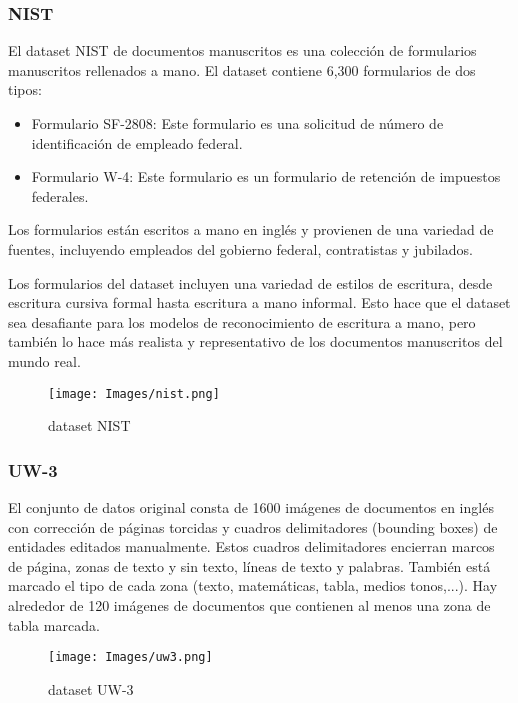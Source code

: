 \documentclass{article}
\begin{document}
\subsubsection{NIST}

El dataset NIST \cite{11} de documentos manuscritos es una colección de formularios manuscritos rellenados a mano. El dataset contiene 6,300 formularios de dos tipos:
\begin{itemize}
    \item Formulario SF-2808: Este formulario es una solicitud de número de identificación de empleado federal.
    \item Formulario W-4: Este formulario es un formulario de retención de impuestos federales.
\end{itemize}

Los formularios están escritos a mano en inglés y provienen de una variedad de fuentes, incluyendo empleados del gobierno federal, contratistas y jubilados.

 Los formularios del dataset incluyen una variedad de estilos de escritura, desde escritura cursiva formal hasta escritura a mano informal. Esto hace que el dataset sea desafiante para los modelos de reconocimiento de escritura a mano, pero también lo hace más realista y representativo de los documentos manuscritos del mundo real.
\begin{figure}[h]
    \centering
    \texttt{[image: Images/nist.png]}
    \caption{dataset NIST}
    \label{fig:enter-label}
\end{figure}

\newpage
\subsubsection{UW-3}
El conjunto de datos original consta de 1600 imágenes de documentos en inglés con corrección de páginas torcidas y cuadros delimitadores (bounding boxes) de entidades editados manualmente. Estos cuadros delimitadores encierran marcos de página, zonas de texto y sin texto, líneas de texto y palabras. También está marcado el tipo de cada zona (texto, matemáticas, tabla, medios tonos,...). Hay alrededor de 120 imágenes de documentos que contienen al menos una zona de tabla marcada.

\begin{figure}[h]
    \centering
    \texttt{[image: Images/uw3.png]}
    \caption{dataset UW-3}
    \label{fig:enter-label}
\end{figure}
\end{document}
